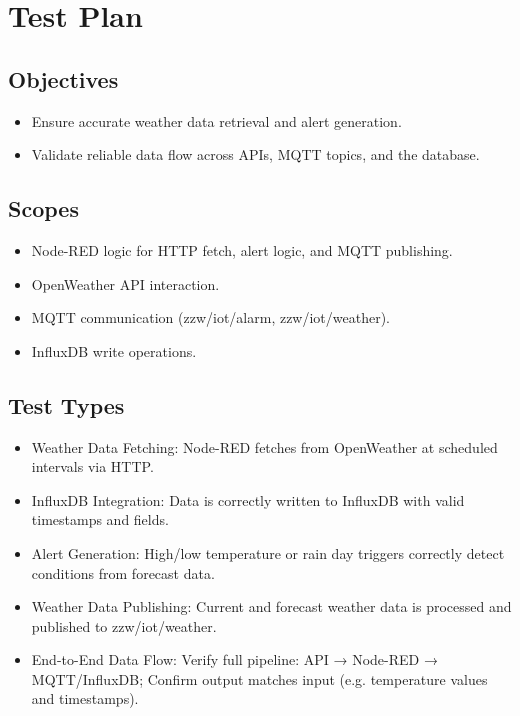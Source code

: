 \section{Test Plan}

\subsection{Objectives}
\begin{itemize}
    \item Ensure accurate weather data retrieval and alert generation.
    \item Validate reliable data flow across APIs, MQTT topics, and the database.
\end{itemize}

\subsection{Scopes}
\begin{itemize}
    \item Node-RED logic for HTTP fetch, alert logic, and MQTT publishing.
    \item OpenWeather API interaction.
    \item MQTT communication (zzw/iot/alarm, zzw/iot/weather).
    \item InfluxDB write operations.
\end{itemize}

\subsection{Test Types}
\begin{itemize}
    \item Weather Data Fetching: Node-RED fetches from OpenWeather at scheduled intervals via HTTP.
    \item InfluxDB Integration: Data is correctly written to InfluxDB with valid timestamps and fields.
    \item Alert Generation: High/low temperature or rain day triggers correctly detect conditions from forecast data.
    \item Weather Data Publishing: Current and forecast weather data is processed and published to zzw/iot/weather.
    \item End-to-End Data Flow: Verify full pipeline: API → Node-RED → MQTT/InfluxDB; Confirm output matches input (e.g. temperature values and timestamps).
\end{itemize}

